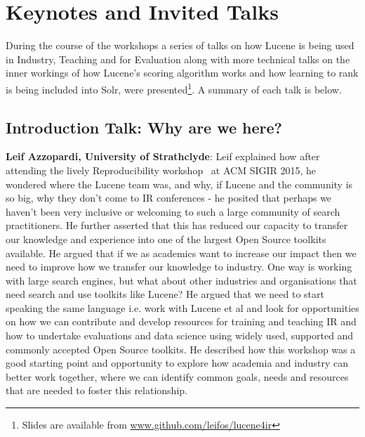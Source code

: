 \section{Keynotes and Invited Talks}
During the course of the workshops a series of talks on how Lucene is being used in Industry, Teaching and for Evaluation along with more technical talks on the inner workings of how Lucene's scoring algorithm works and how learning to rank is being included into Solr, were presented\footnote{\scriptsize{Slides are available from \url{www.github.com/leifos/lucene4ir}}}. A summary of each talk is below.

\subsection*{Introduction Talk: Why are we here?}
{\bf Leif Azzopardi, University of Strathclyde}:
Leif explained how after attending the lively Reproducibility workshop~\cite{arguello2016repro} at ACM SIGIR 2015, he wondered where the Lucene team was, and why, if Lucene and the community is so big, why they don't come to IR conferences - he posited that perhaps we haven't been very inclusive or welcoming to such a large community of search practitioners. He further asserted that this has reduced our capacity to transfer our knowledge and experience into one of the largest Open Source toolkits available. He argued that if we as academics want to increase our impact then we need to improve how we transfer our knowledge to industry. One way is working with large search engines, but what about other industries and organisations that need search and use toolkits like Lucene? He argued that we need to start speaking the same language i.e. work with Lucene et al and look for opportunities on how we can contribute and develop resources for training and teaching IR and how to undertake evaluations and data science using widely used, supported and commonly accepted Open Source toolkits. He described how this workshop was a good starting point and opportunity to explore how academia and industry can better work together, where we can identify common goals, needs and resources that are needed to foster this relationship. 










